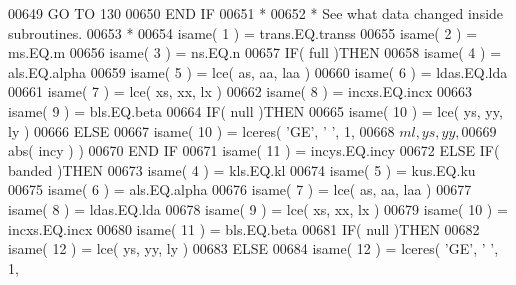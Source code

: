 \begin{DoxyCode}
00649                                  \textcolor{keywordflow}{GO TO} 130
00650 \textcolor{keywordflow}{                              END IF}
00651 \textcolor{comment}{*}
00652 \textcolor{comment}{*                             See what data changed inside subroutines.}
00653 \textcolor{comment}{*}
00654                               isame( 1 ) = trans.EQ.transs
00655                               isame( 2 ) = ms.EQ.m
00656                               isame( 3 ) = ns.EQ.n
00657                               \textcolor{keywordflow}{IF}( full )\textcolor{keywordflow}{THEN}
00658                                  isame( 4 ) = als.EQ.alpha
00659                                  isame( 5 ) = lce( as, aa, laa )
00660                                  isame( 6 ) = ldas.EQ.lda
00661                                  isame( 7 ) = lce( xs, xx, lx )
00662                                  isame( 8 ) = incxs.EQ.incx
00663                                  isame( 9 ) = bls.EQ.beta
00664                                  \textcolor{keywordflow}{IF}( null )\textcolor{keywordflow}{THEN}
00665                                     isame( 10 ) = lce( ys, yy, ly )
00666                                  \textcolor{keywordflow}{ELSE}
00667                                     isame( 10 ) = lceres( \textcolor{stringliteral}{'GE'}, \textcolor{stringliteral}{' '}, 1,
00668      $                                            ml, ys, yy,
00669      $                                            abs( incy ) )
00670 \textcolor{keywordflow}{                                 END IF}
00671                                  isame( 11 ) = incys.EQ.incy
00672                               \textcolor{keywordflow}{ELSE} \textcolor{keywordflow}{IF}( banded )\textcolor{keywordflow}{THEN}
00673                                  isame( 4 ) = kls.EQ.kl
00674                                  isame( 5 ) = kus.EQ.ku
00675                                  isame( 6 ) = als.EQ.alpha
00676                                  isame( 7 ) = lce( as, aa, laa )
00677                                  isame( 8 ) = ldas.EQ.lda
00678                                  isame( 9 ) = lce( xs, xx, lx )
00679                                  isame( 10 ) = incxs.EQ.incx
00680                                  isame( 11 ) = bls.EQ.beta
00681                                  \textcolor{keywordflow}{IF}( null )\textcolor{keywordflow}{THEN}
00682                                     isame( 12 ) = lce( ys, yy, ly )
00683                                  \textcolor{keywordflow}{ELSE}
00684                                     isame( 12 ) = lceres( \textcolor{stringliteral}{'GE'}, \textcolor{stringliteral}{' '}, 1,

\end{DoxyCode}
